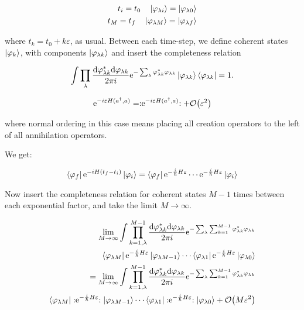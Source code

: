 \begin{align*}
    t_{i} = t_{0} \quad \ket{\varphi_{\lambda i}} = \ket{\varphi_{\lambda 0}} \\ 
    t_{M} = t_{f} \quad \ket{\varphi_{\lambda M}} = \ket{\varphi_{\lambda f}}
\end{align*}

where $t_{k} = t_{0} + k\varepsilon$, as usual. Between each time-step, we define coherent states $\ket{\varphi_{k}}$, with components $\ket{\varphi_{\lambda k}}$ and insert the completeness relation

\begin{equation*}
    \int \prod_{\lambda} \frac{\dd \varphi_{\lambda k}^{*} \dd \varphi_{\lambda k}}{2\pi i} \mathrm{e}^{-\sum_{\lambda} \varphi_{\lambda k}^{*} \varphi_{\lambda k}} \ket{\varphi_{\lambda k}} \bra{\varphi_{\lambda k}} = 1.
\end{equation*}

\begin{equation*}
    \e^{-i\varepsilon H(a^{\dagger}, a)} = \normord{\e^{-i\varepsilon H(a^{\dagger}, a)}} + \order{\varepsilon^{2}}
\end{equation*}

where normal ordering in this case means placing all creation operators to the left of all annihilation operators. 

We get: 

\begin{equation*}
    \bra{\varphi_{f}} \mathrm{e}^{-iH(t_{f} - t_{i})} \ket{\varphi_{i}} = \bra{\varphi_{f}} \mathrm{e}^{-\frac{i}{\hbar} H \varepsilon} \cdots  \mathrm{e}^{-\frac{i}{\hbar} H \varepsilon} \ket{\varphi_{i}}
\end{equation*}

Now insert the completeness relation for coherent states $M-1$ times between each exponential factor, and take the limit $M \to \infty$. 

\begin{align*}
    \lim_{M \to \infty} \int \prod_{k = 1, \lambda}^{M-1} \frac{\dd \varphi_{\lambda k}^{*} \dd \varphi_{\lambda k}}{2\pi i} \e^{-\sum_{\lambda} \sum_{k = 1}^{M-1}\varphi_{\lambda k}^{*} \varphi_{\lambda k}}  \\ \bra{\varphi_{\lambda M}} \e^{-\frac{i}{\hbar} H \varepsilon}\ket{\varphi_{\lambda M-1}} \cdots \bra{\varphi_{\lambda 1}} \e^{-\frac{i}{\hbar} H \varepsilon}\ket{\varphi_{\lambda 0}} \\ 
    = \lim_{M \to \infty} \int \prod_{k = 1, \lambda}^{M-1} \frac{\dd \varphi_{\lambda k}^{*} \dd \varphi_{\lambda k}}{2\pi i} \e^{-\sum_{\lambda} \sum_{k = 1}^{M-1}\varphi_{\lambda k}^{*} \varphi_{\lambda k}}\\ \bra{\varphi_{\lambda M}} \normord{\e^{-\frac{i}{\hbar} H \varepsilon}}\ket{\varphi_{\lambda M-1}} \cdots \bra{\varphi_{\lambda 1}} \normord{\e^{-\frac{i}{\hbar} H \varepsilon}}\ket{\varphi_{\lambda 0}} + \order{M\varepsilon^{2}}
\end{align*}

